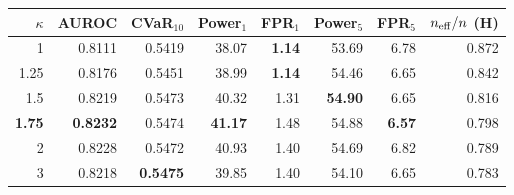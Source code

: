 \begin{tabular}{@{}rrrrrrrr@{}}
\toprule
$\kappa$ & AUROC & CVaR$_{10}$ & Power$_1$ & FPR$_1$ & Power$_5$ & FPR$_5$ & $n_{\rm eff}/n$ (H) \\
\midrule
1 & 0.8111 & 0.5419 & 38.07 & \textbf{1.14} & 53.69 & 6.78 & 0.872 \\
1.25 & 0.8176 & 0.5451 & 38.99 & \textbf{1.14} & 54.46 & 6.65 & 0.842 \\
1.5 & 0.8219 & 0.5473 & 40.32 & 1.31 & \textbf{54.90} & 6.65 & 0.816 \\
\textbf{1.75} & \textbf{0.8232} & 0.5474 & \textbf{41.17} & 1.48 & 54.88 & \textbf{6.57} & 0.798 \\
2 & 0.8228 & 0.5472 & 40.93 & 1.40 & 54.69 & 6.82 & 0.789 \\
3 & 0.8218 & \textbf{0.5475} & 39.85 & 1.40 & 54.10 & 6.65 & 0.783 \\
\bottomrule
\end{tabular}
